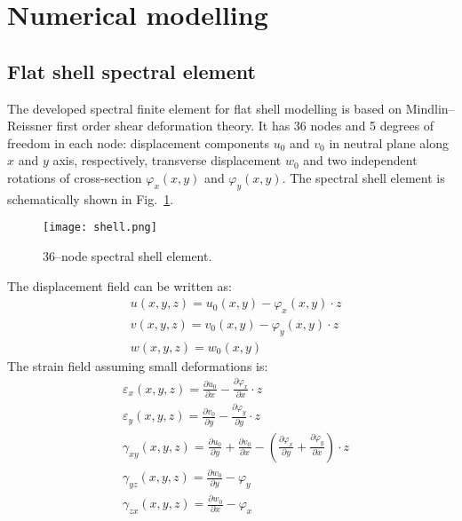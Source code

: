 \documentclass[preprint,12pt]{elsarticle}
\begin{document}
	\section{Numerical modelling}
	\subsection{Flat shell spectral element}
	The developed spectral finite element for flat shell modelling is based on Mindlin--Reissner first order shear deformation theory. It has 36 nodes and 5 degrees of freedom in each node: displacement components $u_0$ and $v_0$ in neutral plane along $x$ and $y$ axis, respectively, transverse displacement $w_0$ and two independent rotations of cross-section $\varphi_x(x,y)$ and $\varphi_y(x,y)$. The spectral shell element is schematically shown in Fig.~\ref{fig:spectral_shell_element}.
	\begin{figure} [h!]
		\centering
		\texttt{[image: shell.png]}	
		\caption{36--node spectral shell element.}
		\label{fig:spectral_shell_element}
	\end{figure}
	The displacement field can be written as:
	\begin{equation}
	\begin{split}
	& u(x,y,z)=u_0(x,y) - \varphi_x(x,y) \cdot z\\
	& v(x,y,z)=v_0(x,y) - \varphi_y(x,y) \cdot z\\
	& w(x,y,z)=w_0(x,y) \label{eq:delam_platedispl}
	\end{split}
	\end{equation}
	The strain field assuming small deformations is:
	\begin{equation}
	\begin{split}
	& \varepsilon_x(x,y,z)= \frac{\partial u_0}{\partial x} - \frac{\partial \varphi_x}{\partial x} \cdot z\\
	& \varepsilon_y(x,y,z)=\frac{\partial v_0}{\partial y} - \frac{\partial \varphi_y}{\partial y} \cdot z\\
	& \gamma_{xy}(x,y,z)= \frac{\partial u_0}{\partial y} +  \frac{\partial v_0}{\partial x} - \left( \frac{\partial \varphi_x}{\partial y} + \frac{\partial \varphi_y}{\partial x}\right)\cdot z\\
	& \gamma_{yz}(x,y,z)= \frac{\partial w_0}{\partial y} - \varphi_y\\
	& \gamma_{zx}(x,y,z)= \frac{\partial w_0}{\partial x} - \varphi_x 
	\label{eq:delam_platestrains}
	\end{split}
	\end{equation}
\end{document}
